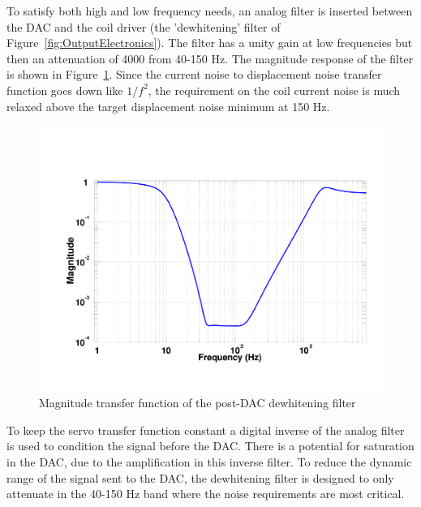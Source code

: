 To satisfy both high and low frequency needs, an analog filter
is inserted between the DAC and the coil driver (the 'dewhitening' filter
of Figure~\ref{fig:OutputElectronics}). The filter has a unity gain
at low frequencies but then an attenuation of 4000 from 40-150 Hz. The
magnitude response of the filter is shown in Figure~\ref{fig:DWF}. Since
the current noise to displacement noise transfer function goes down
like $1/f^2$, the requirement on the coil current noise is much relaxed
above the target displacement noise minimum at 150 Hz.  
\begin{figure}[!h]
\centerline{
\includegraphics[angle=0,width=6.5in]{Figures/Chap4/dwf2.pdf}}
\caption[Dewhitening Filter]{Magnitude transfer function of the 
                             post-DAC dewhitening filter}
\label{fig:DWF}
\end{figure}
To keep the servo transfer function constant a digital inverse of
the analog filter is used to condition the signal before the DAC. There
is a potential for saturation in the DAC, due to the amplification in this
inverse filter. To reduce the dynamic range of the signal sent to the DAC,
the dewhitening filter is designed to only attenuate in the 40-150 Hz band
where the noise requirements are most critical.

